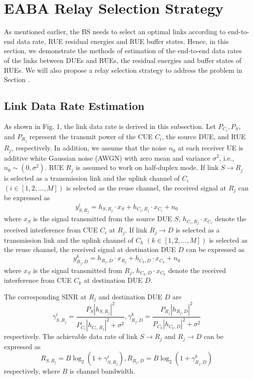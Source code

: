 \documentclass[conference]{IEEEtran}
\begin{document}
\section{EABA Relay Selection Strategy}
As mentioned earlier, the BS needs to select an optimal links according to end-to-end data rate, RUE residual energies and RUE buffer states. Hence, in this section, we demonstrate the methods of estimation of the end-to-end data rates of the links between DUEs and RUEs, the residual energies and buffer states of RUEs. We will also propose a relay selection strategy to address the problem in Section \uppercase\expandafter{}.

\subsection{Link Data Rate Estimation}
As shown in Fig. 1, the link data rate is derived in this subsection. Let $P_{C_i},P_S$, and $P_{R_j}$ represent the transmit power of the CUE $C_i$, the source DUE, and RUE $R_j$, respectively. In addition, we assume that the noise $n_0$ at each receiver UE is additive white Gaussian noise (AWGN) with zero mean and variance $\sigma^2$, i.e., $n_0 \sim (0,\sigma^2)$. RUE $R_j$ is assumed to work on half-duplex mode. If link $S \rightarrow R_j$ is selected as a transmission link and the uplink channel of $C_i$ $(i \in [1,2,\ldots,M])$ is selected as the reuse channel, the received signal at $R_j$ can be expressed as
\begin{equation}
y^i_{S,R_j} = h_{S,R_j}\cdot x_S + h_{C_i,R_j}\cdot x_{C_i} + n_0
\end{equation}
where $x_S$ is the signal transmitted from the source DUE $S$, $h_{C_i,R_j}\cdot x_{C_i}$ denote the received interference from CUE $C_i$ at $R_j$. If link $R_j \rightarrow D$ is selected as a transmission link and the uplink channel of $C_k$ $(k \in [1,2,\ldots,M])$ is selected as the reuse channel, the received signal at destination DUE $D$ can be expressed as
\begin{equation}
y^k_{R_j,D} = h_{R_j,D}\cdot x_{R_j} + h_{C_k,D}\cdot x_{C_k} + n_0
\end{equation}
where $x_S$ is the signal transmitted from $R_j$, $h_{C_k,D}\cdot x_{C_k}$ denote the received interference from CUE $C_k$ at destination DUE $D$.

The corresponding SINR at $R_j$ and destination DUE $D$ are
\begin{equation}
\gamma^{i}_{S,R_j} = \frac{P_S|{h_{S,R_j}}|^{2}}{P_{C_i}|{h_{C_i,R_j}}|^{2} + \sigma^2} ,\gamma^{k}_{R_j,D} = \frac{P_{R_j}|{h_{R_j,D}}|^{2}}{P_{C_k}|{h_{C_k,D}}|^{2} + \sigma^2}
\end{equation}
respectively. The achievable data rate of link $S \rightarrow R_j$ and $R_j \rightarrow D$ can be expressed as
\begin{equation}
R_{S,R_j} = B\log_2(1 + \gamma^{i}_{S,R_{j}}),R_{R_j,D} = B\log_2(1 + \gamma^{k}_{R_j,D})
\end{equation}
respectively, where $B$ is channel bandwidth.
\end{document}
